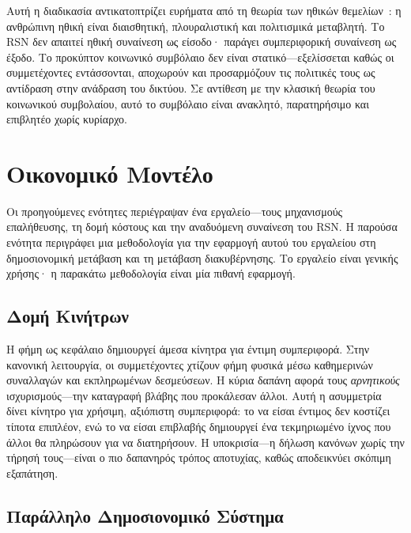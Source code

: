 \documentclass[11pt,a4paper,twocolumn]{article}
\begin{document}
Αυτή η διαδικασία αντικατοπτρίζει ευρήματα από τη θεωρία των ηθικών θεμελίων~\cite{haidt2012}: η ανθρώπινη ηθική είναι διαισθητική, πλουραλιστική και πολιτισμικά μεταβλητή. Το RSN δεν απαιτεί ηθική συναίνεση ως είσοδο· παράγει συμπεριφορική συναίνεση ως έξοδο. Το προκύπτον κοινωνικό συμβόλαιο δεν είναι στατικό---εξελίσσεται καθώς οι συμμετέχοντες εντάσσονται, αποχωρούν και προσαρμόζουν τις πολιτικές τους ως αντίδραση στην ανάδραση του δικτύου. Σε αντίθεση με την κλασική θεωρία του κοινωνικού συμβολαίου, αυτό το συμβόλαιο είναι ανακλητό, παρατηρήσιμο και επιβλητέο χωρίς κυρίαρχο.

\section{Οικονομικό Μοντέλο}

Οι προηγούμενες ενότητες περιέγραψαν ένα εργαλείο---τους μηχανισμούς επαλήθευσης, τη δομή κόστους και την αναδυόμενη συναίνεση του RSN. Η παρούσα ενότητα περιγράφει μια μεθοδολογία για την εφαρμογή αυτού του εργαλείου στη δημοσιονομική μετάβαση και τη μετάβαση διακυβέρνησης. Το εργαλείο είναι γενικής χρήσης· η παρακάτω μεθοδολογία είναι μία πιθανή εφαρμογή.

\subsection{Δομή Κινήτρων}

Η φήμη ως κεφάλαιο δημιουργεί άμεσα κίνητρα για έντιμη συμπεριφορά. Στην κανονική λειτουργία, οι συμμετέχοντες χτίζουν φήμη φυσικά μέσω καθημερινών συναλλαγών και εκπληρωμένων δεσμεύσεων. Η κύρια δαπάνη αφορά τους \emph{αρνητικούς} ισχυρισμούς---την καταγραφή βλάβης που προκάλεσαν άλλοι. Αυτή η ασυμμετρία δίνει κίνητρο για χρήσιμη, αξιόπιστη συμπεριφορά: το να είσαι έντιμος δεν κοστίζει τίποτα επιπλέον, ενώ το να είσαι επιβλαβής δημιουργεί ένα τεκμηριωμένο ίχνος που άλλοι θα πληρώσουν για να διατηρήσουν. Η υποκρισία---η δήλωση κανόνων χωρίς την τήρησή τους---είναι ο πιο δαπανηρός τρόπος αποτυχίας, καθώς αποδεικνύει σκόπιμη εξαπάτηση.

\subsection{Παράλληλο Δημοσιονομικό Σύστημα}
\end{document}
